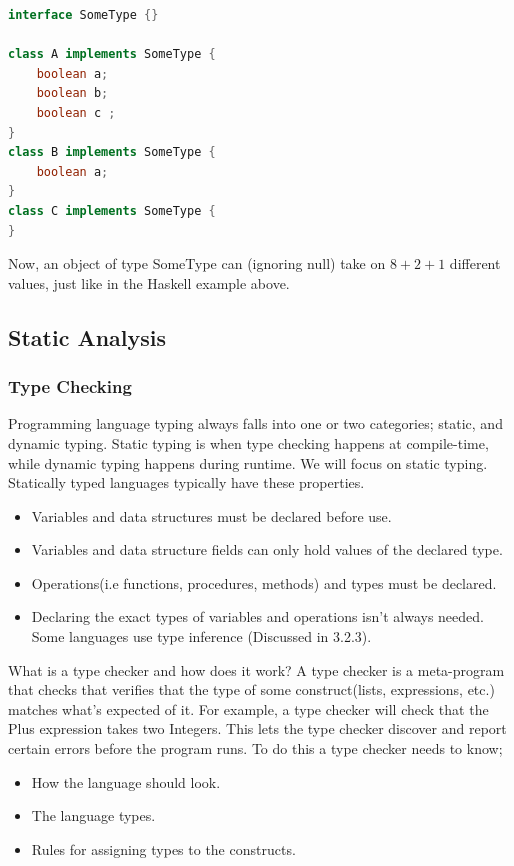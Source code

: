 \documentclass[tikz, border=5mm]{article}
\begin{document}
\begin{itemize}
\begin{lstlisting}[language=Java]
interface SomeType {}

class A implements SomeType {
    boolean a;
    boolean b;
    boolean c ;
}
class B implements SomeType {
    boolean a;
}
class C implements SomeType {
}

\end{lstlisting}
    Now, an object of type SomeType can (ignoring null) take on $8 + 2 + 1$ different values,
    just like in the Haskell example above.


        \end{itemize}
        \subsection{Static Analysis}
            \subsubsection{Type Checking}
            Programming language typing always falls into one or two categories; static, and dynamic typing. Static typing is when type checking happens at compile-time, 
            while dynamic typing happens during runtime. We will focus on static typing. 
            Statically typed languages typically have these properties.
            \begin{itemize}
                \item Variables and data structures must be declared before use.
                \item Variables and data structure fields can only hold values of the declared type.
                \item Operations(i.e functions, procedures, methods) and types must be declared.
                \item Declaring the exact types of variables and operations isn't always needed. Some languages use type inference (Discussed in 3.2.3).
            \end{itemize}

            What is a type checker and how does it work? 
            A type checker is a meta-program that checks that verifies that the type of some construct(lists, expressions, etc.) matches what's expected of it.
            For example, a type checker will check that the Plus \gls{expression} takes two Integers. This lets the type checker discover and report certain errors before the program runs. 
            To do this a type checker needs to know;
            \begin{itemize}
                \item How the language should look.
                \item The language types.
                \item Rules for assigning types to the constructs.
            \end{itemize}
\end{document}
